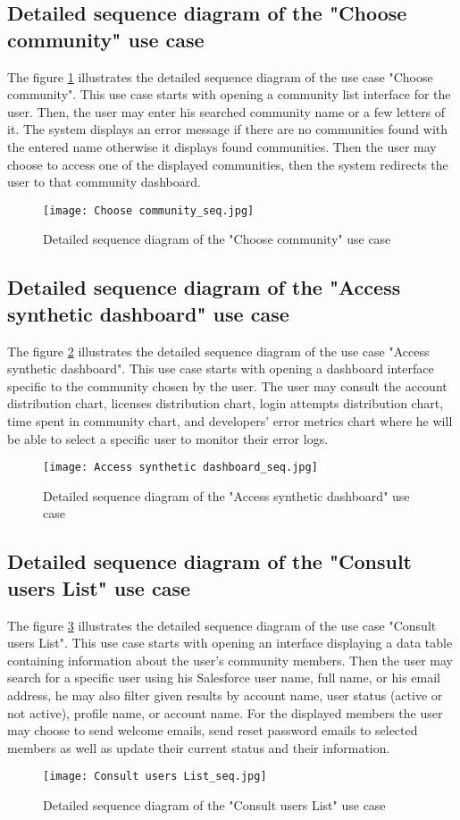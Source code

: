 \subsection{Detailed sequence diagram of the "Choose community" use case}
The figure \ref{choose_seq} illustrates the detailed sequence diagram of the use case
"Choose community".
This use case starts with opening a community list interface
for the user. Then, the user may enter his searched community name or a few letters of it.
The system displays an error message if there are no communities found with the entered name otherwise it displays found communities. Then the user may choose to access one of the displayed communities, then the system redirects the user to that community dashboard. 
\begin{figure}[H]%
    \center   
    \texttt{[image: Choose community\_seq.jpg]}
    \caption{Detailed sequence diagram of the "Choose community" use case}
    \label{choose_seq}
\end{figure}
\subsection{Detailed sequence diagram of the "Access synthetic dashboard" use case}
The figure \ref{dashboard_seq} illustrates the detailed sequence diagram of the use case
"Access synthetic dashboard".
This use case starts with opening a dashboard interface specific to the community chosen
by the user. The user may consult the account distribution chart, licenses distribution chart, login attempts distribution chart, time spent in community chart, and developers' error metrics chart where he will be able to select a specific user to monitor their error logs.
  \begin{figure}[H]%
    \center   
    \texttt{[image: Access synthetic dashboard\_seq.jpg]}
    \caption{Detailed sequence diagram of the "Access synthetic dashboard" use case}
    \label{dashboard_seq}
\end{figure}

\subsection{Detailed sequence diagram of the "Consult users List" use case}
The figure \ref{userlist_seq} illustrates the detailed sequence diagram of the use case
"Consult users List".
This use case starts with opening an interface displaying a data table containing information about the user's community members. Then the user may search for a specific user using his Salesforce user name, full name, or his email address, he may also filter given results by account name, user status (active or not active), profile name, or account name. For the displayed members the user may choose to send welcome emails, send reset password emails to selected members as well as update their current status and their information.
 \begin{figure}[H]%
    \center   
    \texttt{[image: Consult users List\_seq.jpg]}
    \caption{Detailed sequence diagram of the "Consult users List" use case}
    \label{userlist_seq}
\end{figure}
